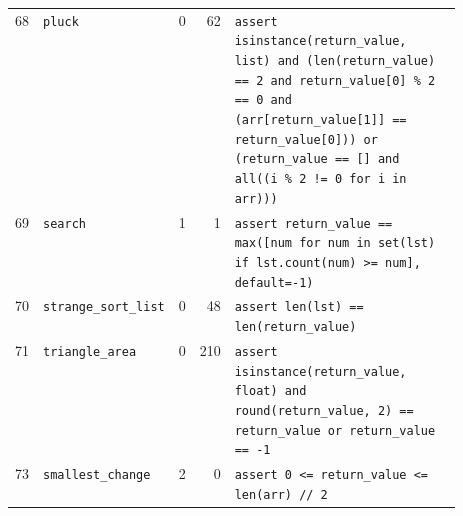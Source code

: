 \begin{footnotesize}
\begin{longtable}{@{}r l r r p{0.52\linewidth}@{}}
68 & \texttt{pluck} & 0 & 62 & \texttt{assert \allowbreak{}isinstance(\allowbreak{}return\_value,\allowbreak{} \allowbreak{}list)\allowbreak{} \allowbreak{}and \allowbreak{}(\allowbreak{}len(\allowbreak{}return\_value)\allowbreak{} \allowbreak{}=\allowbreak{}=\allowbreak{} \allowbreak{}2 \allowbreak{}and \allowbreak{}return\_value[\allowbreak{}0]\allowbreak{} \allowbreak{}\% \allowbreak{}2 \allowbreak{}=\allowbreak{}=\allowbreak{} \allowbreak{}0 \allowbreak{}and \allowbreak{}(\allowbreak{}arr[\allowbreak{}return\_value[\allowbreak{}1]\allowbreak{}]\allowbreak{} \allowbreak{}=\allowbreak{}=\allowbreak{} \allowbreak{}return\_value[\allowbreak{}0]\allowbreak{})\allowbreak{})\allowbreak{} \allowbreak{}or \allowbreak{}(\allowbreak{}return\_value \allowbreak{}=\allowbreak{}=\allowbreak{} \allowbreak{}[\allowbreak{}]\allowbreak{} \allowbreak{}and \allowbreak{}all(\allowbreak{}(\allowbreak{}i \allowbreak{}\% \allowbreak{}2 \allowbreak{}!=\allowbreak{} \allowbreak{}0 \allowbreak{}for \allowbreak{}i \allowbreak{}in \allowbreak{}arr)\allowbreak{})\allowbreak{})\allowbreak{}} \\
69 & \texttt{search} & 1 & 1 & \texttt{assert \allowbreak{}return\_value \allowbreak{}=\allowbreak{}=\allowbreak{} \allowbreak{}max(\allowbreak{}[\allowbreak{}num \allowbreak{}for \allowbreak{}num \allowbreak{}in \allowbreak{}set(\allowbreak{}lst)\allowbreak{} \allowbreak{}if \allowbreak{}lst.\allowbreak{}count(\allowbreak{}num)\allowbreak{} \allowbreak{}>\allowbreak{}=\allowbreak{} \allowbreak{}num]\allowbreak{},\allowbreak{} \allowbreak{}default=\allowbreak{}-\allowbreak{}1)\allowbreak{}} \\
70 & \texttt{strange\_sort\_list} & 0 & 48 & \texttt{assert \allowbreak{}len(\allowbreak{}lst)\allowbreak{} \allowbreak{}=\allowbreak{}=\allowbreak{} \allowbreak{}len(\allowbreak{}return\_value)\allowbreak{}} \\
71 & \texttt{triangle\_area} & 0 & 210 & \texttt{assert \allowbreak{}isinstance(\allowbreak{}return\_value,\allowbreak{} \allowbreak{}float)\allowbreak{} \allowbreak{}and \allowbreak{}round(\allowbreak{}return\_value,\allowbreak{} \allowbreak{}2)\allowbreak{} \allowbreak{}=\allowbreak{}=\allowbreak{} \allowbreak{}return\_value \allowbreak{}or \allowbreak{}return\_value \allowbreak{}=\allowbreak{}=\allowbreak{} \allowbreak{}-\allowbreak{}1} \\
73 & \texttt{smallest\_change} & 2 & 0 & \texttt{assert \allowbreak{}0 \allowbreak{}<\allowbreak{}=\allowbreak{} \allowbreak{}return\_value \allowbreak{}<\allowbreak{}=\allowbreak{} \allowbreak{}len(\allowbreak{}arr)\allowbreak{} \allowbreak{}/\allowbreak{}/\allowbreak{} \allowbreak{}2} \\

\end{longtable}
\end{footnotesize}
